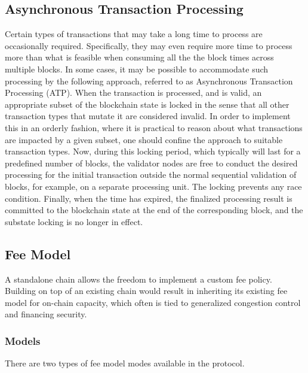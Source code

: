 \documentclass{article}
\begin{document}
\subsection{Asynchronous Transaction Processing}
\label{sec:asynchronous_transaction_processing}

Certain types of transactions that may take a long time to process are occasionally required. Specifically, they may even require more time to process more than what is feasible when consuming all the the block times across multiple blocks. In some cases, it may be possible to accommodate such processing by the following approach, referred to as Asynchronous Transaction Processing (ATP). When the transaction is processed, and is valid, an appropriate subset of the blockchain state is locked in the sense that all other transaction types that mutate it are considered invalid. In order to implement this in an orderly fashion, where it is practical to reason about what transactions are impacted by a given subset, one should confine the approach to suitable transaction types. Now, during this locking period, which typically will last for a predefined number of blocks, the validator nodes are free to conduct the desired processing for the initial transaction outside the normal sequential validation of blocks, for example, on a separate processing unit. The locking prevents any race condition. Finally, when the time has expired, the finalized processing result is committed to the blockchain state at the end of the corresponding block, and the substate locking is no longer in effect.


\subsection{Fee Model}

A standalone chain allows the freedom to implement a custom fee policy. Building on top of an existing chain would result in inheriting its existing fee model for on-chain capacity, which often is tied to generalized congestion control and financing security.

\subsubsection{Models}

There are two types of fee model modes available in the protocol.
\end{document}
